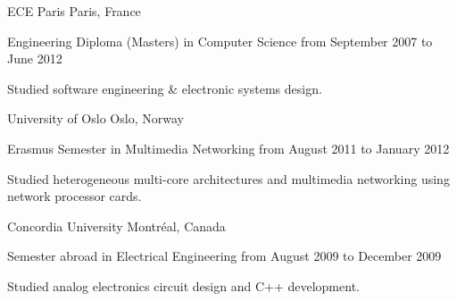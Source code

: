 \documentclass[10pt, a4paper]{awesome-cv}
\begin{document}
\begin{cventries}
	\cventrytitle
	{ECE Paris}
	{Paris, France}

	\cventry
	{Engineering Diploma (Masters) in Computer Science}
	{from September 2007 to June 2012}
	{
		\begin{cvparagraph}
			Studied software engineering \& electronic systems design.
		\end{cvparagraph}
		\vspace{4pt}
	}

	\cventrytitle
	{University of Oslo}
	{Oslo, Norway}

	\cventry
	{Erasmus Semester in Multimedia Networking}
	{from August 2011 to January 2012}
	{
		\begin{cvparagraph}
			Studied heterogeneous multi-core architectures and multimedia networking using network processor cards.
		\end{cvparagraph}
		\vspace{4pt}
	}

	\cventrytitle
	{Concordia University}
	{Montréal, Canada}

	\cventry
	{Semester abroad in Electrical Engineering}
	{from August 2009 to December 2009}
	{
		\begin{cvparagraph}
			Studied analog electronics circuit design and C++ development.
		\end{cvparagraph}
		\vspace{4pt}
	}

\end{cventries}


\begin{cventries}
\end{cventries}
\end{document}
